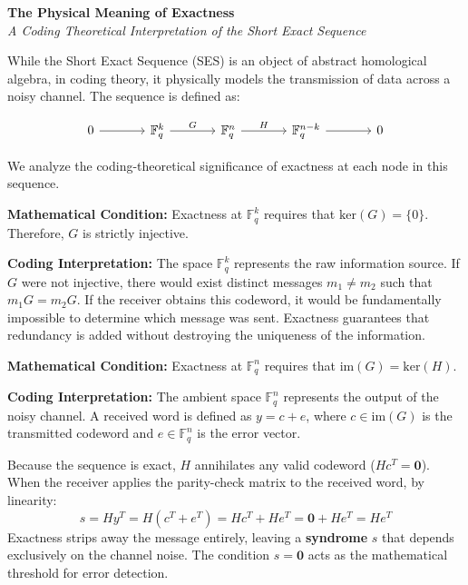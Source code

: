 \documentclass[11pt, a4paper, twoside]{article}
\newcommand{\F}{\mathbb{F}}
\newcommand{\im}{\text{im}}
\newcommand{\kerop}{\text{ker}}
\begin{document}
	
	\begin{center}
		{\Large \textbf{The Physical Meaning of Exactness}} \\[0.5em]
		{\normalsize \textit{A Coding Theoretical Interpretation of the Short Exact Sequence}}
	\end{center}
	\vspace{1em}
	
	While the Short Exact Sequence (SES) is an object of abstract homological algebra, in coding theory, it physically models the transmission of data across a noisy channel. The sequence is defined as:
	
	\[
	\begin{tikzcd}[column sep=large]
		0 \arrow[r] & \F_q^k \arrow[r, "G"] & \F_q^n \arrow[r, "H"] & \F_q^{n-k} \arrow[r] & 0
	\end{tikzcd}
	\]
	
	We analyze the coding-theoretical significance of exactness at each node in this sequence.
	
	\vspace{1em}
	
	\begin{conceptbox}
		\textbf{Mathematical Condition:} Exactness at $\F_q^k$ requires that $\kerop(G) = \{0\}$. Therefore, $G$ is strictly injective.
		
		\textbf{Coding Interpretation:} 
		The space $\F_q^k$ represents the raw information source. If $G$ were not injective, there would exist distinct messages $m_1 \neq m_2$ such that $m_1 G = m_2 G$. If the receiver obtains this codeword, it would be fundamentally impossible to determine which message was sent. Exactness guarantees that redundancy is added without destroying the uniqueness of the information.
	\end{conceptbox}
	
	\vspace{1em}
	
	\begin{conceptbox}
		\textbf{Mathematical Condition:} Exactness at $\F_q^n$ requires that $\im(G) = \kerop(H)$.
		
		\textbf{Coding Interpretation:} 
		The ambient space $\F_q^n$ represents the output of the noisy channel. A received word is defined as $y = c + e$, where $c \in \im(G)$ is the transmitted codeword and $e \in \F_q^n$ is the error vector.
		
		Because the sequence is exact, $H$ annihilates any valid codeword ($Hc^T = \mathbf{0}$). When the receiver applies the parity-check matrix to the received word, by linearity:
		$$ s = Hy^T = H(c^T + e^T) = Hc^T + He^T = \mathbf{0} + He^T = He^T $$
		Exactness strips away the message entirely, leaving a \textbf{syndrome} $s$ that depends exclusively on the channel noise. The condition $s = \mathbf{0}$ acts as the mathematical threshold for error detection.
	\end{conceptbox}
	
\end{document}

